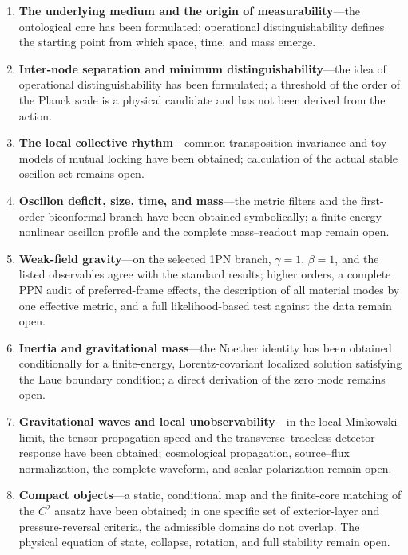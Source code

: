 \documentclass[11pt,a4paper]{article}
\begin{document}
\begin{enumerate}
\item \textbf{The underlying medium and the origin of measurability}---the ontological core has been formulated; operational distinguishability defines the starting point from which space, time, and mass emerge.

\item \textbf{Inter-node separation and minimum distinguishability}---the idea of operational distinguishability has been formulated; a threshold of the order of the Planck scale is a physical candidate and has not been derived from the action.

\item \textbf{The local collective rhythm}---common-transposition invariance and toy models of mutual locking have been obtained; calculation of the actual stable oscillon set remains open.

\item \textbf{Oscillon deficit, size, time, and mass}---the metric filters and the first-order biconformal branch have been obtained symbolically; a finite-energy nonlinear oscillon profile and the complete mass--readout map remain open.

\item \textbf{Weak-field gravity}---on the selected 1PN branch, $\gamma=1$, $\beta=1$, and the listed observables agree with the standard results; higher orders, a complete PPN audit of preferred-frame effects, the description of all material modes by one effective metric, and a full likelihood-based test against the data remain open.

\item \textbf{Inertia and gravitational mass}---the Noether identity has been obtained conditionally for a finite-energy, Lorentz-covariant localized solution satisfying the Laue boundary condition; a direct derivation of the zero mode remains open.

\item \textbf{Gravitational waves and local unobservability}---in the local Minkowski limit, the tensor propagation speed and the transverse--traceless detector response have been obtained; cosmological propagation, source--flux normalization, the complete waveform, and scalar polarization remain open.

\item \textbf{Compact objects}---a static, conditional map and the finite-core matching of the $C^2$ ansatz have been obtained; in one specific set of exterior-layer and pressure-reversal criteria, the admissible domains do not overlap. The physical equation of state, collapse, rotation, and full stability remain open.


\end{enumerate}
\end{document}
